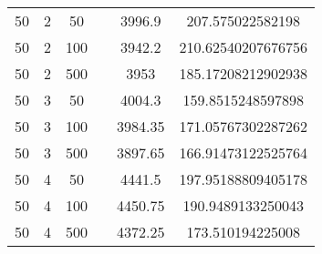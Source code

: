 {\begin{longtabu}{S
S
S
S
S[round-mode=places, round-precision=0]
S[round-mode=places, round-precision=0]}
50 & 2 & 50 & & 3996.9 & 207.575022582198 \\
50 & 2 & 100 & & 3942.2 & 210.62540207676756 \\
50 & 2 & 500 & & 3953 & 185.17208212902938 \\
50 & 3 & 50 & & 4004.3 & 159.8515248597898 \\
50 & 3 & 100 & & 3984.35 & 171.05767302287262 \\
50 & 3 & 500 & & 3897.65 & 166.91473122525764 \\
50 & 4 & 50 & & 4441.5 & 197.95188809405178 \\
50 & 4 & 100 & & 4450.75 & 190.9489133250043 \\
50 & 4 & 500 & & 4372.25 & 173.510194225008 \\
\hline
\end{longtabu}

}
